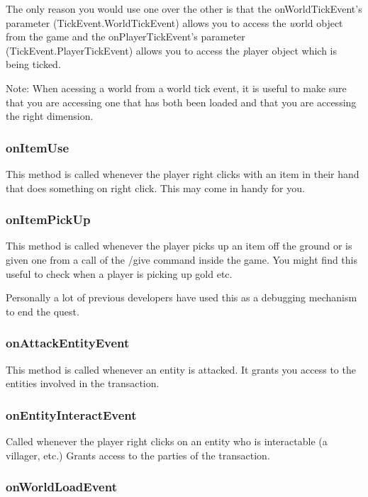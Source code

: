 \documentclass[12pt]{article}
\begin{document}
The only reason you would use one over the other is that the onWorldTickEvent's parameter (TickEvent.WorldTickEvent) allows you to access the {\emph world} object from the game and the onPlayerTickEvent's parameter (TickEvent.PlayerTickEvent) allows you to access the {\emph player} object which is being ticked.

Note: When acessing a world from a world tick event, it is useful to make sure that you are accessing one that has both been loaded and that you are accessing the right dimension.

\subsubsection{onItemUse}

This method is called whenever the player right clicks with an item in their hand that does something on right click. This may come in handy for you.

\subsubsection{onItemPickUp}

This method is called whenever the player picks up an item off the ground or is given one from a call of the /give command inside the game. You might find this useful to check when a player is picking up gold etc.

Personally a lot of previous developers have used this as a debugging mechanism to end the quest.

\subsubsection{onAttackEntityEvent}

This method is called whenever an entity is attacked. It grants you access to the entities involved in the transaction.

\subsubsection{onEntityInteractEvent}

Called whenever the player right clicks on an entity who is interactable (a villager, etc.) Grants access to the parties of the transaction.

\subsubsection{onWorldLoadEvent}
\end{document}
